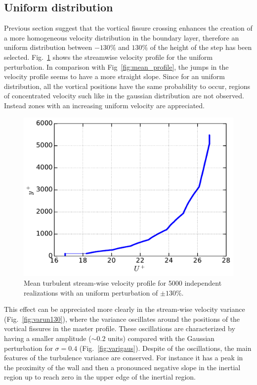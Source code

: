\documentclass[aps,reprint,amsmath,amssymb,pra]{revtex4-1}%
\begin{document}
\subsection{Uniform distribution}
Previous section suggest that the vortical fissure crossing enhances the creation of a more homogeneous velocity distribution in the boundary layer, therefore an uniform distribution between $-130\%$ and $130\%$ of the height of the step has been selected. Fig.~\ref{fig:mp_un130}  shows the streamwise velocity profile for the uniform perturbation. In comparison with Fig~\ref{fig:mean_profile}, the jumps in the velocity profile seems to have a more straight slope. Since for an uniform distribution, all the vortical positions have the same probability to occur, regions of concentrated velocity such like in the gaussian distribution are not observed. Instead zones with an increasing uniform velocity are appreciated.   
\begin{figure}[htb]
\includegraphics[scale=0.46]{figures/Master_averaged_step_profile_5000_assembles_un130}
\caption{\label{fig:mp_un130} Mean turbulent stream-wise velocity profile for 5000 independent realizations with an uniform perturbation of $\pm 130\%$.}
\end{figure}
This effect can be appreciated more clearly in the stream-wise velocity variance (Fig.~\ref{fig:varun130}), where the variance oscillates around the positions of the vortical fissures in the master profile. These oscillations are characterized by having a smaller amplitude ($\sim 0.2$ units) compared with the Gaussian perturbation for $\sigma=0.4$ (Fig.~\ref{fig:varigaus}). Despite of the oscillations, the main features of the turbulence variance are conserved. For instance it has a peak in the proximity of the wall and then a pronounced negative slope in the inertial region up to reach zero in the upper edge of the inertial region.\\
\end{document}
